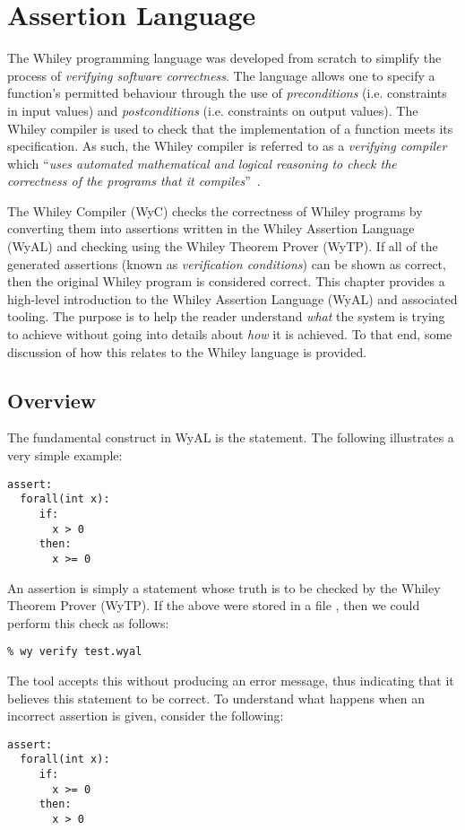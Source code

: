 \chapter{Assertion Language}

The Whiley programming language was developed from scratch to simplify
the process of {\em verifying software correctness}.  The language
allows one to specify a function's permitted behaviour through the use
of {\em preconditions} (i.e. constraints in input values) and {\em
  postconditions} (i.e. constraints on output values).  The Whiley
compiler is used to check that the implementation of a function meets
its specification.  As such, the Whiley compiler is referred to as a
{\em verifying compiler} which ``{\em uses automated mathematical and
  logical reasoning to check the correctness of the programs that it
  compiles}''~\cite{Hoare03}.

The Whiley Compiler (WyC) checks the correctness of Whiley programs by
converting them into assertions written in the Whiley Assertion
Language (WyAL) and checking using the Whiley Theorem Prover (WyTP).
If all of the generated assertions (known as {\em verification
  conditions}) can be shown as correct, then the original Whiley
program is considered correct.  This chapter provides a high-level
introduction to the Whiley Assertion Language (WyAL) and associated
tooling.  The purpose is to help the reader understand {\em what} the
system is trying to achieve without going into details about {\em how}
it is achieved.  To that end, some discussion of how this relates to
the Whiley language is provided.

\section{Overview}
The fundamental construct in WyAL is the  statement.
The following illustrates a very simple example:
\begin{lstlisting}[language=WyAL]
assert:
  forall(int x):
     if:
       x > 0
     then:
       x >= 0
\end{lstlisting}
An assertion is simply a statement whose truth is to be checked by the
Whiley Theorem Prover (WyTP).  If the above were stored in a file
, then we could perform this check as follows:
\begin{verbatim}
% wy verify test.wyal
\end{verbatim}
The tool accepts this without producing an error message, thus
indicating that it believes this statement to be correct.  To
understand what happens when an incorrect assertion is given, consider
the following:
\begin{lstlisting}[language=WyAL]
assert:
  forall(int x):
     if:
       x >= 0
     then:
       x > 0
\end{lstlisting}


